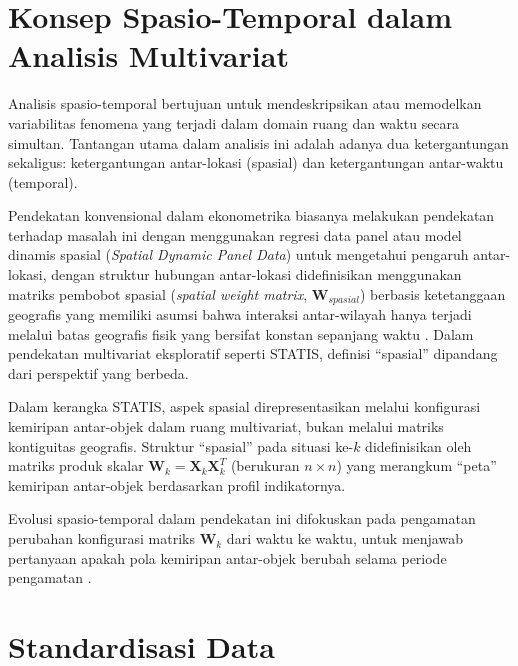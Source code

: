 \section{\normalsize Konsep Spasio-Temporal dalam Analisis Multivariat}

Analisis spasio-temporal bertujuan untuk mendeskripsikan atau memodelkan variabilitas fenomena yang terjadi dalam domain ruang dan waktu secara simultan. Tantangan utama dalam analisis ini adalah adanya dua ketergantungan sekaligus: ketergantungan antar-lokasi (spasial) dan ketergantungan antar-waktu (temporal).

Pendekatan konvensional dalam ekonometrika biasanya melakukan pendekatan terhadap masalah ini dengan menggunakan regresi data panel atau model dinamis spasial (\textit{Spatial Dynamic Panel Data}) untuk mengetahui pengaruh antar-lokasi, dengan struktur hubungan antar-lokasi didefinisikan menggunakan matriks pembobot spasial (\textit{spatial weight matrix}, $\mathbf{W}_{spasial}$) berbasis ketetanggaan geografis yang memiliki asumsi bahwa interaksi antar-wilayah hanya terjadi melalui batas geografis fisik yang bersifat konstan sepanjang waktu \citep{baltagi2021}. Dalam pendekatan multivariat eksploratif seperti STATIS, definisi ``spasial'' dipandang dari perspektif yang berbeda.

\begin{remark}
  Dalam kerangka STATIS, aspek spasial direpresentasikan melalui konfigurasi kemiripan antar-objek dalam ruang multivariat, bukan melalui matriks kontiguitas geografis. Struktur ``spasial'' pada situasi ke-$k$ didefinisikan oleh matriks produk skalar $\mathbf{W}_k = \mathbf{X}_k \mathbf{X}_k^T$ (berukuran $n \times n$) yang merangkum ``peta'' kemiripan antar-objek berdasarkan profil indikatornya.
\end{remark}

Evolusi spasio-temporal dalam pendekatan ini difokuskan pada pengamatan perubahan konfigurasi matriks $\mathbf{W}_k$ dari waktu ke waktu, untuk menjawab pertanyaan apakah pola kemiripan antar-objek berubah selama periode pengamatan \citep{lavit94}.

\section{\normalsize Standardisasi Data}

